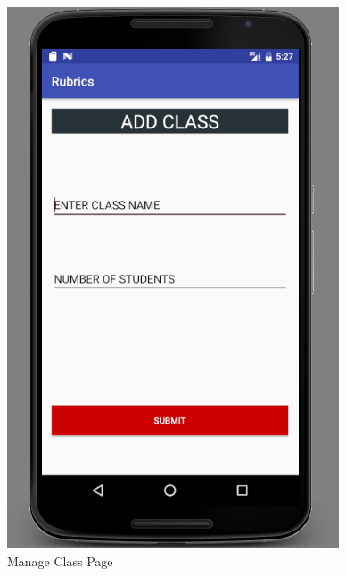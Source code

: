 \begin{figure}[!h]
\begin{minipage}[t]{0.5\linewidth}
\hfill\includegraphics[scale=.65]{project/images/manageclassnew}\hspace*{\fill}
    \caption{Manage Class Page}
    \label{f2}
\end{minipage}        
\end{figure}  

